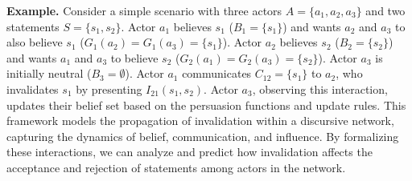 \documentclass[12pt]{article}
\theoremstyle{definition}
\begin{document}

\textbf{Example.} Consider a simple scenario with three actors $A = \{a_1, a_2, a_3\}$ and two statements $S = \{s_1, s_2\}$. Actor $a_1$ believes $s_1$ ($B_1 = \{s_1\}$) and wants $a_2$ and $a_3$ to also believe $s_1$ ($G_1(a_2) = G_1(a_3) = \{s_1\}$). Actor $a_2$ believes $s_2$ ($B_2 = \{s_2\}$) and wants $a_1$ and $a_3$ to believe $s_2$ ($G_2(a_1) = G_2(a_3) = \{s_2\}$). Actor $a_3$ is initially neutral ($B_3 = \emptyset$). Actor $a_1$ communicates $C_{12} = \{s_1\}$ to $a_2$, who invalidates $s_1$ by presenting $I_{21}(s_1, s_2)$. Actor $a_3$, observing this interaction, updates their belief set based on the persuasion functions and update rules. This framework models the propagation of invalidation within a discursive network, capturing the dynamics of belief, communication, and influence. By formalizing these interactions, we can analyze and predict how invalidation affects the acceptance and rejection of statements among actors in the network.



\end{document}

